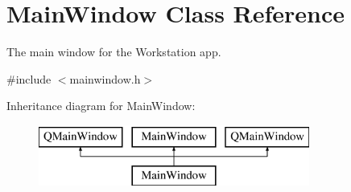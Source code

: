 \hypertarget{class_main_window}{\section{Main\-Window Class Reference}
\label{class_main_window}
}


The main window for the Workstation app.  




{\ttfamily \#include $<$mainwindow.\-h$>$}

Inheritance diagram for Main\-Window\-:\begin{figure}[H]
\begin{center}
\leavevmode
\includegraphics[height=2.000000cm]{class_main_window}
\end{center}
\end{figure}
